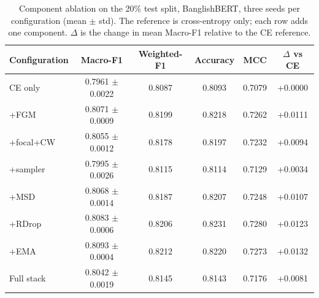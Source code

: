 \begin{table}[!htbp]
\centering
\caption{Component ablation on the 20\% test split, BanglishBERT, three seeds per configuration (mean $\pm$ std). The reference is cross-entropy only; each row adds one component. $\Delta$ is the change in mean Macro-F1 relative to the CE reference.}
\label{tab:component}
\small
\begin{tabular}{@{}lccccc@{}}
\toprule
\textbf{Configuration} & \textbf{Macro-F1} & \textbf{Weighted-F1} & \textbf{Accuracy} & \textbf{MCC} & \textbf{$\Delta$ vs CE} \\
\midrule
CE only & 0.7961 $\pm$ 0.0022 & 0.8087 & 0.8093 & 0.7079 & +0.0000 \\
+FGM & 0.8071 $\pm$ 0.0009 & 0.8199 & 0.8218 & 0.7262 & +0.0111 \\
+focal+CW & 0.8055 $\pm$ 0.0012 & 0.8178 & 0.8197 & 0.7232 & +0.0094 \\
+sampler & 0.7995 $\pm$ 0.0026 & 0.8115 & 0.8114 & 0.7129 & +0.0034 \\
+MSD & 0.8068 $\pm$ 0.0014 & 0.8187 & 0.8207 & 0.7248 & +0.0107 \\
+RDrop & 0.8083 $\pm$ 0.0006 & 0.8206 & 0.8231 & 0.7280 & +0.0123 \\
+EMA & 0.8093 $\pm$ 0.0004 & 0.8212 & 0.8220 & 0.7273 & +0.0132 \\
Full stack & 0.8042 $\pm$ 0.0019 & 0.8145 & 0.8143 & 0.7176 & +0.0081 \\
\bottomrule
\end{tabular}
\end{table}